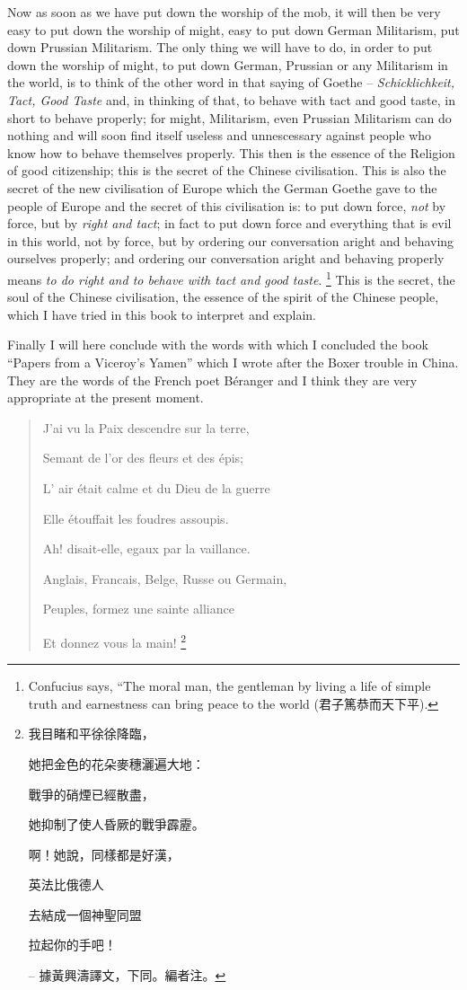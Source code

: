 Now as soon as we have put down the worship of 
the mob, it will then be very easy to put down the 
worship of might, easy to put down German Militarism, 
put down Prussian Militarism.
The only thing we will have to do, in order to put down the worship 
of might, to put down German, Prussian or any 
Militarism in the world, is to think of the other 
word in that saying of Goethe -- \emph{Schicklichkeit, Tact, 
Good Taste} and, in thinking of that, to behave 
with tact and good taste, in short to behave 
properly;
for might, Militarism, even Prussian 
Militarism can do nothing and will soon find itself 
useless and unnescessary against people who know 
how to behave themselves properly.
This then is the 
essence of the Religion of good citizenship; this is the 
secret of the Chinese civilisation. This is also the 
secret of the new civilisation of Europe which the 
German Goethe gave to the people of Europe and the 
secret of this civilisation is: to put down force, \emph{not} by 
force, but by \emph{right and tact};
in fact to put down force 
and everything that is evil in this world, not by force, 
but by ordering our conversation aright and behaving
ourselves properly;
and ordering our conversation
aright and behaving properly means \emph{to do right and to
behave with tact and good taste}. 
\footnote{Confucius says, ``The moral man, the gentleman by living a life 
of simple truth and earnestness can bring peace to the world (君子篤恭而天下平).}
This is the secret, the 
soul of the Chinese civilisation, the essence of the 
spirit of the Chinese people, which I have tried in this 
book to interpret and explain. 

Finally I will here conclude with the words with 
which I concluded the book ``Papers from a Viceroy's 
Yamen'' which I wrote after the Boxer trouble in China.
They are the words of the French poet 
B\'eranger and I think they are very appropriate at 
the present moment.

\begin{quote}
J'ai vu la Paix descendre sur la terre,

Semant de l'or des fleurs et des \'epis;

L' air \'etait calme et du Dieu de la guerre

Elle \'etouffait les foudres assoupis.

Ah! disait-elle, egaux par la vaillance.

Anglais, Francais, Belge, Russe ou Germain,

Peuples, formez une sainte alliance

Et donnez vous la main!
\footnote{我目睹和平徐徐降臨，

她把金色的花朵麥穗灑遍大地：

戰爭的硝煙已經散盡，

她抑制了使人昏厥的戰爭霹靂。

啊！她說，同樣都是好漢，

英法比俄德人

去結成一個神聖同盟

拉起你的手吧！

-- 據黃興濤譯文，下同。編者注。
}
\end{quote}

